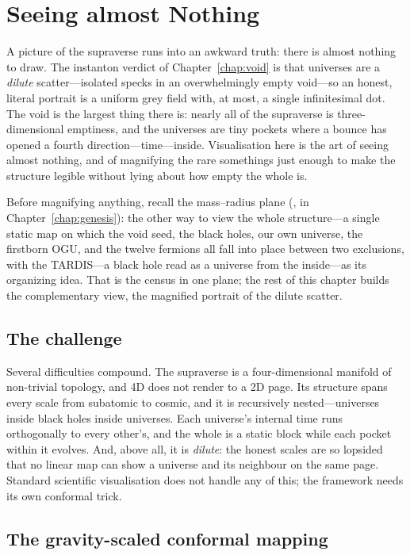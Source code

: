 \chapter{Seeing almost Nothing}
\label{chap:almostnothing}

A picture of the supraverse runs into an awkward truth: there is almost nothing to
draw. The instanton verdict of Chapter~\ref{chap:void} is that universes are a
\emph{dilute} scatter---isolated specks in an overwhelmingly empty void---so an
honest, literal portrait is a uniform grey field with, at most, a single
infinitesimal dot. The void is the largest thing there is: nearly all of the
supraverse is three-dimensional emptiness, and the universes are tiny pockets where
a bounce has opened a fourth direction---time---inside. Visualisation here is the
art of seeing almost nothing, and of magnifying the rare somethings just enough to
make the structure legible without lying about how empty the whole is.

Before magnifying anything, recall the mass--radius plane (, in
Chapter~\ref{chap:genesis}): the other way to view the whole structure---a single static
map on which the void seed, the black holes, our own universe, the firstborn OGU, and the
twelve fermions all fall into place between two exclusions, with the TARDIS---a black hole
read as a universe from the inside---as its organizing idea. That is the census in one
plane; the rest of this chapter builds the complementary view, the magnified portrait of
the dilute scatter.

\section{The challenge}

Several difficulties compound. The supraverse is a four-dimensional manifold of
non-trivial topology, and 4D does not render to a 2D page. Its structure spans
every scale from subatomic to cosmic, and it is recursively nested---universes
inside black holes inside universes. Each universe's internal time runs
orthogonally to every other's, and the whole is a static block while each pocket
within it evolves. And, above all, it is \emph{dilute}: the honest scales are so
lopsided that no linear map can show a universe and its neighbour on the same page.
Standard scientific visualisation does not handle any of this; the framework needs
its own conformal trick.

\section{The gravity-scaled conformal mapping}

